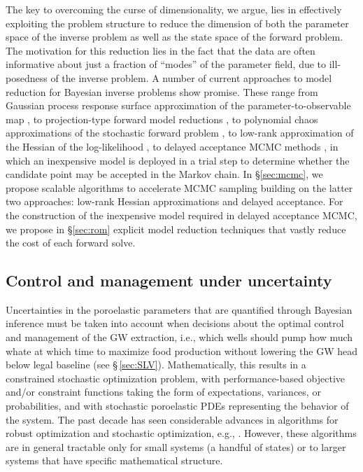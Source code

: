 \documentclass[11pt,final]{article}%
\begin{document}
The key to overcoming the curse of dimensionality, we argue, lies in effectively exploiting the problem structure to
reduce the dimension of both the parameter space of the
inverse problem as well as the state space of the forward problem. The motivation for this reduction lies in the fact that the data are often informative about just a fraction of ``modes'' of the parameter field, due to ill-posedness of the inverse problem.
%
A number of current approaches to model reduction for Bayesian inverse problems show promise. These range from Gaussian process response surface approximation of the parameter-to-observable map
\cite{Kennedy2001, Bui-ThanhGhattasHigdon12}, to projection-type forward model reductions \cite{GalballyFidkowskiWillcoxEtAl10,lwgSISC2010,CuiMarzoukWillcox14}, to polynomial chaos approximations of the stochastic forward problem \cite{MarzoukNajm09,GhanemDoostan06, BadriZabaras04}, to low-rank approximation of the Hessian of the log-likelihood \cite{FlathWilcoxAkcelikEtAl11,MartinWilcoxBursteddeEtAl12,Bui-ThanhBursteddeGhattasEtAl12_gbfinalist,Bui-ThanhGhattasMartinEtAl13,CuiMartinMarzoukEtAl14}, to delayed acceptance MCMC methods
\cite{EfendievHouLuo06,ChristenFox05,CuiMarzoukWillcox14}, in which an inexpensive model is deployed in a trial step to determine whether the candidate point may be accepted in the Markov chain.
%
In \S\ref{sec:mcmc}, we propose scalable algorithms to accelerate MCMC sampling building on the latter two approaches: low-rank Hessian approximations 
and delayed acceptance.  For the construction of the inexpensive model required in delayed acceptance MCMC, we propose in \S\ref{sec:rom} explicit model reduction techniques that vastly reduce the cost of each forward solve.


\subsection{Control and management under uncertainty}\label{sec:control}

Uncertainties in the poroelastic parameters that are quantified through Bayesian inference must be taken into account when decisions about the optimal control and management of the GW extraction, i.e., which wells should pump how much whate at which time to maximize food production without lowering the GW head below legal baseline (see \S\,\ref{sec:SLV}). Mathematically, this results in a  constrained stochastic optimization problem, with performance-based objective and/or constraint functions taking the form of expectations, variances, or probabilities, and with stochastic poroelastic PDEs representing the behavior of the system. The past decade has seen considerable advances in algorithms for robust optimization and stochastic optimization, e.g., \cite{bertsimas2004price, ben2006extending,birge1997introduction,shapiro2009lectures}. However, these algorithms are in general tractable only for small systems (a handful of states) or to larger systems that have specific mathematical structure.
\end{document}
